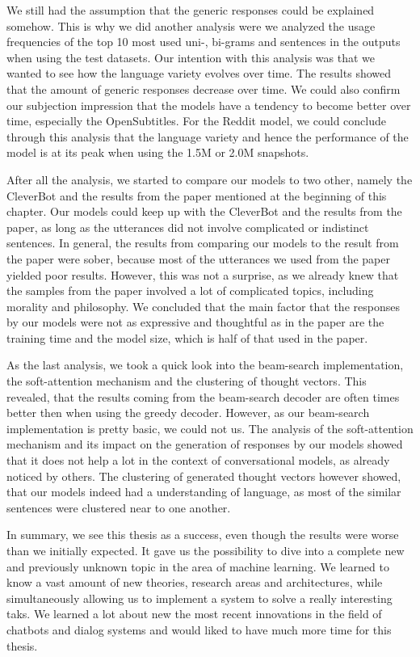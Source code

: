 We still had the assumption that the generic responses could be explained somehow. This is why we did another analysis were we analyzed the usage frequencies of the top 10 most used uni-, bi-grams and sentences in the outputs when using the test datasets. Our intention with this analysis was that we wanted to see how the language variety evolves over time. The results showed that the amount of generic responses decrease over time. We could also confirm our subjection impression that the models have a tendency to become better over time, especially the OpenSubtitles. For the Reddit model, we could conclude through this analysis that the language variety and hence the performance of the model is at its peak when using the 1.5M or 2.0M snapshots.

After all the analysis, we started to compare our models to two other, namely the CleverBot and the results from the paper mentioned at the beginning of this chapter. Our models could keep up with the CleverBot and the results from the paper, as long as the utterances did not involve complicated or indistinct sentences. In general, the results from comparing our models to the result from the paper were sober, because most of the utterances we used from the paper yielded poor results. However, this was not a surprise, as we already knew that the samples from the paper involved a lot of complicated topics, including morality and philosophy. We concluded that the main factor that the responses by our models were not as expressive and thoughtful as in the paper are the training time and the model size, which is half of that used in the paper.

As the last analysis, we took a quick look into the beam-search implementation, the soft-attention mechanism and the clustering of thought vectors. This revealed, that the results coming from the beam-search decoder are often times better then when using the greedy decoder. However, as our beam-search implementation is pretty basic, we could not us. The analysis of the soft-attention mechanism and its impact on the generation of responses by our models showed that it does not help a lot in the context of conversational models, as already noticed by others. The clustering of generated thought vectors however showed, that our models indeed had a understanding of language, as most of the similar sentences were clustered near to one another.

In summary, we see this thesis as a success, even though the results were worse than we initially expected. It gave us the possibility to dive into a complete new and previously unknown topic in the area of machine learning. We learned to know a vast amount of new theories, research areas and architectures, while simultaneously allowing us to implement a system to solve a really interesting taks. We learned a lot about new the most recent innovations in the field of chatbots and dialog systems and would liked to have much more time for this thesis.

